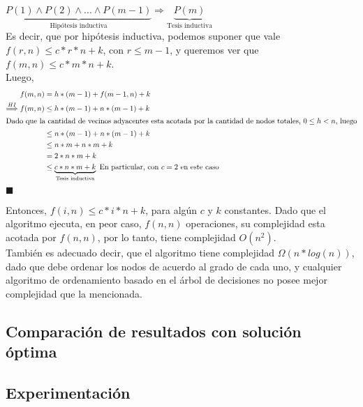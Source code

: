 $\underbrace{P(1) \wedge P(2) \wedge ... \wedge P(m-1)}_{\text{Hipótesis inductiva}} \Rightarrow \underbrace{P(m)}_{\text{Tesis inductiva}}$\\

Es decir, que por hipótesis inductiva, podemos suponer que vale $f(r,n) \leq c*r*n + k$, con $r \leq m-1$, y queremos ver que $f(m,n) \leq c*m*n + k$.\\
Luego,
\begin{align*}
f(m,n) & = h*(m-1) + f(m-1,n) + k \\
 \stackrel{HI}{\Longrightarrow} f(m,n) & \leq h*(m-1) + n*(m-1) + k \\
 \intertext{Dado que la cantidad de vecinos adyacentes esta acotada por la cantidad de nodos totales, $0 \leq h < n$, luego}
 & \leq n*(m-1)+n*(m-1) + k\\
 & \leq n*m + n*m + k\\
 & = 2*n*m + k\\
 & \leq \underbrace{c*n*m + k}_{\text{Tesis inductiva}} \text{       En particular, con $c = 2$ en este caso}
\end{align*}
\hfill $\blacksquare$

Entonces, $f(i,n) \leq c*i*n + k$, para algún $c$ y $k$ constantes.
Dado que el algoritmo ejecuta, en peor caso, $f(n,n)$ operaciones, su complejidad esta acotada por $f(n,n)$, por lo tanto, tiene complejidad $O(n^{2})$.\\

También es adecuado decir, que el algoritmo tiene complejidad $\Omega(n*log(n))$, dado que debe ordenar los nodos de acuerdo al grado de cada uno, y cualquier algoritmo de ordenamiento basado en el árbol de decisiones no posee mejor complejidad que la mencionada.

\subsection{Comparaci\'on de resultados con soluci\'on \'optima}
\subsection{Experimentaci\'on}
